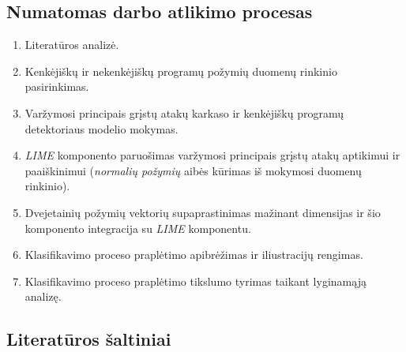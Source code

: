 \subsection{Numatomas darbo atlikimo procesas}

\begin{enumerate}
    \item Literatūros analizė.
    \item Kenkėjiškų ir nekenkėjiškų programų požymių duomenų rinkinio pasirinkimas.
    \item Varžymosi principais grįstų atakų karkaso ir kenkėjiškų programų detektoriaus modelio mokymas.
    \item \textit{LIME} komponento paruošimas varžymosi principais grįstų atakų aptikimui ir paaiškinimui (\textit{normalių požymių} aibės kūrimas iš mokymosi duomenų rinkinio).
    \item Dvejetainių požymių vektorių supaprastinimas mažinant dimensijas ir šio komponento integracija su \textit{LIME} komponentu.
    \item Klasifikavimo proceso praplėtimo apibrėžimas ir iliustracijų rengimas.
    \item Klasifikavimo proceso praplėtimo tikslumo tyrimas taikant lyginamąją analizę.
\end{enumerate}

\subsection{Literatūros šaltiniai}
